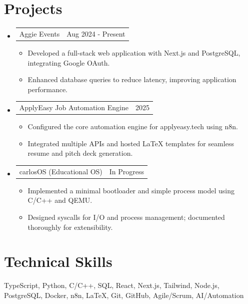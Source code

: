 \documentclass[letterpaper,11pt]{article}
\makeatletter
\newcommand{\resumeItem}[1]{
  \item\small{{#1 \vspace{-2pt}}}
}
\newcommand{\resumeProjectHeading}[2]{
  \item
  \begin{tabular*}{0.97\textwidth}{l@{\extracolsep{\fill}}r}
    \small#1 & #2 \\
  \end{tabular*}\vspace{-7pt}
}
\newcommand{\resumeSubHeadingListStart}{\begin{itemize}[leftmargin=0.15in, label={}]}
\newcommand{\resumeSubHeadingListEnd}{\end{itemize}}
\newcommand{\resumeItemListStart}{\begin{itemize}}
\newcommand{\resumeItemListEnd}{\end{itemize}\vspace{-5pt}}
\makeatother
\begin{document}
\section{Projects}
\resumeSubHeadingListStart
\resumeProjectHeading
{Aggie Events}{Aug 2024 - Present}
\resumeItemListStart
\resumeItem{Developed a full-stack web application with Next.js and PostgreSQL, integrating Google OAuth.}
\resumeItem{Enhanced database queries to reduce latency, improving application performance.}
\resumeItemListEnd

\resumeProjectHeading
{ApplyEasy Job Automation Engine}{2025}
\resumeItemListStart
\resumeItem{Configured the core automation engine for applyeasy.tech using n8n.}
\resumeItem{Integrated multiple APIs and hosted LaTeX templates for seamless resume and pitch deck generation.}
\resumeItemListEnd

\resumeProjectHeading
{carlosOS (Educational OS)}{In Progress}
\resumeItemListStart
\resumeItem{Implemented a minimal bootloader and simple process model using C/C++ and QEMU.}
\resumeItem{Designed syscalls for I/O and process management; documented thoroughly for extensibility.}
\resumeItemListEnd
\resumeSubHeadingListEnd

\section{Technical Skills}
TypeScript, Python, C/C++, SQL, React, Next.js, Tailwind, Node.js, PostgreSQL, Docker, n8n, LaTeX, Git, GitHub, Agile/Scrum, AI/Automation
\end{document}

